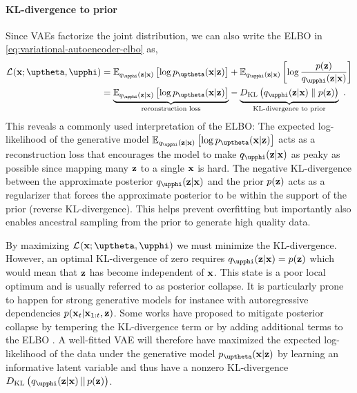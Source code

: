 \paragraph{KL-divergence to prior}
Since VAEs factorize the joint distribution, we can also write the ELBO in \cref{eq:variational-autoencoder-elbo} as,
%
\begin{align} \label{eq:variational-autoencoder-elbo-factorized}
    \mathcal{L}_{}(\xb;\thetab,\phib)
    &= \mathbb{E}_{q_\phib(\zb|\xb)}\left[\log p_\thetab(\xb|\zb)\right] + \mathbb{E}_{q_\phib(\zb|\xb)} \left[ \log \frac{p(\zb)}{q_\phib(\zb|\xb)}\right] \nonumber \\
    &= 
    \underset{\text{reconstruction loss}}{\underbrace{
        \mathbb{E}_{q_\phib(\zb|\xb)}\left[\log p_\thetab(\xb|\zb)\right]
    }}
     - 
    \underset{\text{KL-divergence to prior}}{
        \underbrace{\vphantom{\mathbb{E}_{q_\phib(\zb|\xb)}\left[\log p_\thetab(\xb|\zb)\right]}{D_\text{KL}\left( q_\phib(\zb|\xb) \parallel p(\zb) \right)}
    }} \enspace .
\end{align}
%
This reveals a commonly used interpretation of the ELBO: 
The expected log-likelihood of the generative model $\mathbb{E}_{q_\phib(\zb|\xb)}\left[\log p_\thetab(\xb|\zb)\right]$ acts as a reconstruction loss that encourages the model to make $q_\phib(\zb|\xb)$ as peaky as possible since mapping many ${\mathbf{z}}$ to a single ${\mathbf{x}}$ is hard. 
The negative KL-divergence between the approximate posterior $q_\phib(\zb|\xb)$ and the prior $p({\mathbf{z}})$ acts as a regularizer that forces the approximate posterior to be within the support of the prior (reverse KL-divergence). This helps prevent overfitting but importantly also enables ancestral sampling from the prior to generate high quality data. 

By maximizing $\mathcal{L}_{}(\xb;\thetab,\phib)$ we must minimize the KL-divergence. However, an optimal KL-divergence of zero requires $q_\phib(\zb|\xb) = p(\zb)$ which would mean that ${\mathbf{z}}$ has become independent of ${\mathbf{x}}$. 
This state is a poor local optimum and is usually referred to as posterior collapse. It is particularly prone to happen for strong generative models for instance with autoregressive dependencies $p({\mathbf{x}}_{t}|{\mathbf{x}}_{1:t},{\mathbf{z}})$. Some works have proposed to mitigate posterior collapse by tempering the KL-divergence term \parencite{alemi_fixing_2018,higgins_vvae_2017} or by adding additional terms to the ELBO \parencite{zhao_infovae_2018}. 
A well-fitted VAE will therefore have maximized the expected log-likelihood of the data under the generative model $p_\thetab(\xb|\zb)$ by learning an informative latent variable and thus have a nonzero KL-divergence $D_\text{KL}\left( q_\phib(\zb|\xb) \,||\, p(\zb) \right)$. 


